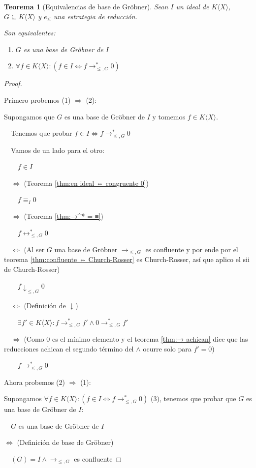 \documentclass{amsbook}
\theoremstyle{customstyle}
\newtheorem{theorem}{Teorema}[section]
\begin{document}
\begin{theorem}[Equivalencias de base de Gröbner]
Sean $I$ un ideal de $K⟨X⟩$, $G ⊆ K⟨X⟩$ y $e_≤$ una estrategia de reducción.

Son equivalentes:
\begin{enumerate}
\item $G$ es una base de Gröbner de $I$

\item $∀f ∈ K⟨X⟩ : (f ∈ I ⇔ f →^*_{≤, G} 0)$

\end{enumerate}

\end{theorem}
\begin{proof}\

Primero probemos (1) $⇒$ (2):

Supongamos que $G$ es una base de Gröbner de $I$ y tomemos $f ∈ K⟨X⟩$.

  Tenemos que probar $f ∈ I ⇔ f →^*_{≤, G} 0$

  Vamos de un lado para el otro:

    $f ∈ I$

  $⇔$ (Teorema \ref{thm:en ideal ⇔ congruente 0})

    $f ≡_I 0$

  $⇔$ (Teorema \ref{thm:→^* = ≡})

    $f ↔^*_{≤, G} 0$

  $⇔$ (Al ser $G$ una base de Gröbner $→_{≤, G}$ es confluente y por ende por el teorema \ref{thm:confluente ⇔ Church-Rosser} es Church-Rosser, así que aplico el sii de Church-Rosser)

    $f ↓_{≤, G} 0$

  $⇔$ (Definición de $↓$)

    $∃f' ∈ K⟨X⟩ : f →^*_{≤, G} f' ∧ 0 →^*_{≤, G} f'$

  $⇔$ (Como $0$ es el mínimo elemento y el teorema \ref{thm:→ achican} dice que las reducciones achican el segundo término del $∧$ ocurre solo para $f' = 0$)

    $f →^*_{≤, G} 0$

Ahora probemos (2) $⇒$ (1):

Supongamos $∀f ∈ K⟨X⟩ : (f ∈ I ⇔ f →^*_{≤, G} 0)$ (3), tenemos que probar que $G$ es una base de Gröbner de $I$:

  $G$ es una base de Gröbner de $I$

$⇔$ (Definición de base de Gröbner)

  $(G) = I ∧ →_{≤, G}$ es confluente


\end{proof}
\end{document}
